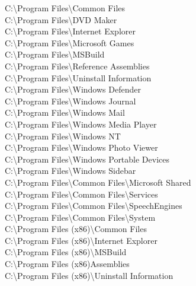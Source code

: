 \noindent C:\textbackslash Program Files\textbackslash Common Files \\
C:\textbackslash Program Files\textbackslash DVD Maker \\
C:\textbackslash Program Files\textbackslash Internet Explorer \\
C:\textbackslash Program Files\textbackslash Microsoft Games \\
C:\textbackslash Program Files\textbackslash MSBuild \\
C:\textbackslash Program Files\textbackslash Reference Assemblies \\
C:\textbackslash Program Files\textbackslash Uninstall Information \\
C:\textbackslash Program Files\textbackslash Windows Defender \\
C:\textbackslash Program Files\textbackslash Windows Journal \\
C:\textbackslash Program Files\textbackslash Windows Mail \\
C:\textbackslash Program Files\textbackslash Windows Media Player \\
C:\textbackslash Program Files\textbackslash Windows NT \\
C:\textbackslash Program Files\textbackslash Windows Photo Viewer \\
C:\textbackslash Program Files\textbackslash Windows Portable Devices \\
C:\textbackslash Program Files\textbackslash Windows Sidebar \\
C:\textbackslash Program Files\textbackslash Common Files\textbackslash Microsoft Shared \\
C:\textbackslash Program Files\textbackslash Common Files\textbackslash Services \\
C:\textbackslash Program Files\textbackslash Common Files\textbackslash SpeechEngines \\
C:\textbackslash Program Files\textbackslash Common Files\textbackslash System \\
C:\textbackslash Program Files (x86)\textbackslash Common Files \\
C:\textbackslash Program Files (x86)\textbackslash Internet Explorer \\
C:\textbackslash Program Files (x86)\textbackslash MSBuild \\
C:\textbackslash Program Files (x86)\textbackslashReference Assemblies \\
C:\textbackslash Program Files (x86)\textbackslash Uninstall Information \\
